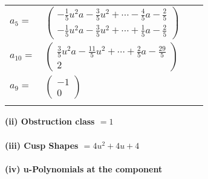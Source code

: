 \documentclass[1p]{elsarticle_modified}
\theoremstyle{definition}
\begin{document}
\begin{tabular}{m{7pt} m{180pt} m{7pt} m{180pt} }
\flushright $a_{5}=$&$\begin{pmatrix}-\frac{1}{5} u^2 a-\frac{3}{5} u^2+\cdots-\frac{4}{5} a-\frac{2}{5}\\-\frac{1}{5} u^2 a-\frac{3}{5} u^2+\cdots+\frac{1}{5} a-\frac{2}{5}\end{pmatrix}$ \\
\flushright $a_{10}=$&$\begin{pmatrix}\frac{3}{5} u^2 a-\frac{11}{5} u^2+\cdots+\frac{2}{5} a-\frac{29}{5}\\2\end{pmatrix}$ \\
\flushright $a_{9}=$&$\begin{pmatrix}-1\\0\end{pmatrix}$\\&\end{tabular}
\flushleft \textbf{(ii) Obstruction class $= 1$}\\~\\
\flushleft \textbf{(iii) Cusp Shapes $= 4 u^2+4 u+4$}\\~\\
\newpage\renewcommand{\arraystretch}{1}
\flushleft \textbf{(iv) u-Polynomials at the component}\newline \\
\end{document}
